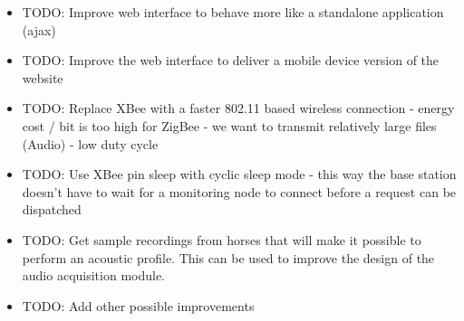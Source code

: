 \begin{itemize}
\item TODO: Improve web interface to behave more like a standalone application (ajax)
\item  TODO: Improve the web interface to deliver a mobile device version of the website
\item  TODO: Replace XBee with a faster 802.11 based wireless connection - energy cost / bit is too high for ZigBee - we want to transmit relatively large files (Audio) - low duty cycle
\item  TODO: Use XBee pin sleep with cyclic sleep mode - this way the base station doesn’t have to wait for a monitoring node to connect before a request can be dispatched
\item  TODO: Get sample recordings from horses that will make it possible to perform an acoustic  profile. This can be used to improve the design of the audio acquisition module.
\item  TODO: Add other possible improvements
\end{itemize}